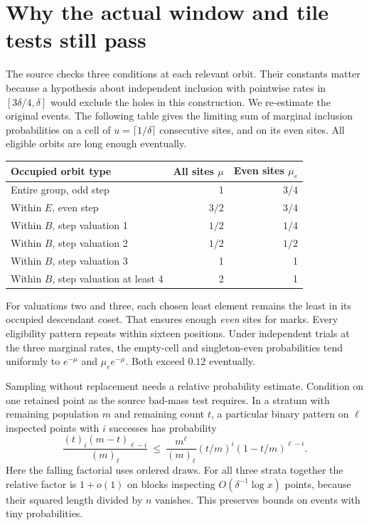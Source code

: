 \documentclass[12pt,letterpaper]{article}
\newcommand{\pagepart}[1]{\clearpage\section{#1}}
\begin{document}
\pagepart{Why the actual window and tile tests still pass}
The source checks three conditions at each relevant orbit. Their constants matter because a hypothesis about independent inclusion with pointwise rates in \([3\delta/4,\delta]\) would exclude the holes in this construction. We re-estimate the original events. The following table gives the limiting sum of marginal inclusion probabilities on a cell of \(u=\lceil1/\delta\rceil\) consecutive sites, and on its even sites. All eligible orbits are long enough eventually.
\begin{center}\begin{tabular}{@{}lrr@{}}\toprule
Occupied orbit type & All sites \(\mu\) & Even sites \(\mu_e\)\\\midrule
Entire group, odd step & 1 & \(3/4\)\\
Within \(E\), even step & \(3/2\) & \(3/4\)\\
Within \(B\), step valuation 1 & \(1/2\) & \(1/4\)\\
Within \(B\), step valuation 2 & \(1/2\) & \(1/2\)\\
Within \(B\), step valuation 3 & 1 & 1\\
Within \(B\), step valuation at least 4 & 2 & 1\\\bottomrule
\end{tabular}\end{center}
For valuations two and three, each chosen least element remains the least in its occupied descendant coset. That ensures enough \emph{even} sites for marks. Every eligibility pattern repeats within sixteen positions. Under independent trials at the three marginal rates, the empty-cell and singleton-even probabilities tend uniformly to \(e^{-\mu}\) and \(\mu_e e^{-\mu}\). Both exceed \(0.12\) eventually.

Sampling without replacement needs a relative probability estimate. Condition on one retained point as the source bad-mass test requires. In a stratum with remaining population \(m\) and remaining count \(t\), a particular binary pattern on \(\ell\) inspected points with \(i\) successes has probability
\[
 \frac{(t)_i(m-t)_{\ell-i}}{(m)_\ell}
 \ \le\ \frac{m^\ell}{(m)_\ell}(t/m)^i(1-t/m)^{\ell-i}.
\]
Here the falling factorial uses ordered draws. For all three strata together the relative factor is \(1+o(1)\) on blocks inspecting \(O(\delta^{-1}\log x)\) points, because their squared length divided by \(n\) vanishes. This preserves bounds on events with tiny probabilities.
\end{document}
